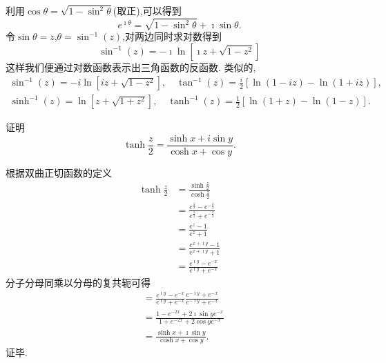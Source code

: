 


利用$\cos \theta = \sqrt{1 - \sin ^2 \theta }$(取正),可以得到
\begin{equation}
  e^{\imath \theta} = \sqrt{ 1 - \sin ^2 \theta } + \imath \sin \theta .  
\end{equation} 
令$\sin \theta = z$,$\theta = \sin^{-1} (z)$,对两边同时求对数得到
\begin{equation}
    \sin^{-1} (z) = -\imath \ln \left[ \imath z + \sqrt{1-z^2} \right]
\end{equation}
这样我们便通过对数函数表示出三角函数的反函数.
类似的,
\begin{equation}
    \begin{array}{cc}
    \sin ^{-1}(z)=-i \ln \left[i z+\sqrt{1-z^2}\right], \quad \tan ^{-1}(z)=\frac{i}{2}[\ln (1-i z)-\ln (1+i z)], \\
    \sinh ^{-1}(z)=\ln \left[z+\sqrt{1+z^2}\right], \quad \tanh ^{-1}(z)=\frac{1}{2}[\ln (1+z)-\ln (1-z)] .
    \end{array}
\end{equation}

\begin{example}
    证明
    \[
        \tanh \frac{z}{2}=\frac{\sinh x+i \sin y}{\cosh x+\cos y} .  
    \]
\end{example}
\begin{solution}
根据双曲正切函数的定义
\begin{align*}
    \tanh \frac{z}{2} &= \frac{\sinh \frac{z}{2} }{ \cosh \frac{z}{2}}
    \\
    &= \frac{e^{\frac{z}{2}} - e^{-\frac{z}{2}}}{e^{\frac{z}{2}} + e^{-\frac{z}{2}}}
    \\
    &= \frac{e^{z} - 1}{e^{z} + 1} 
    \\
    &= \frac{e^{x+\imath y } -1 } { e^{x + \imath y } + 1}
    \\
    &=\frac{e^{\imath y } -e^{-x} } { e^{\imath y } + e^{-x}}
\end{align*}   
分子分母同乘以分母的复共轭可得
\begin{align*}
    &=\frac{e^{\imath y } -e^{-x} } { e^{\imath y } + e^{-x}} \frac{e^{-\imath y } + e^{-x}} { e^{-\imath y } + e^{-x}}
    \\
    &=\frac{ 1 - e^{-2x} + 2 \imath \sin y e^{-x}}{1+ e^{-2x} + 2 \cos y e^{-x} }
    \\
    &= \frac{\sinh x + \imath \sin y} {\cosh x + \cos y} .  
\end{align*}
证毕.
\end{solution}

